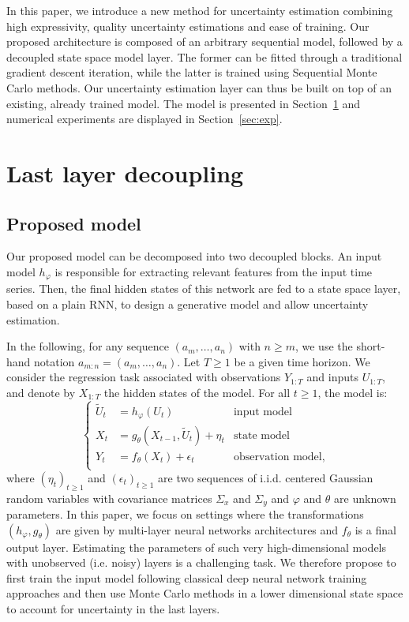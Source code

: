 \documentclass{article}
\begin{document}
In this paper, we introduce a new method for uncertainty estimation combining high expressivity, quality uncertainty estimations and ease of training.
Our proposed architecture is composed of an arbitrary sequential model, followed by a decoupled state space model layer.
The former can be fitted through a traditional gradient descent iteration, while the latter is trained using Sequential Monte Carlo methods.
Our uncertainty estimation layer can thus be built on top of an existing, already trained model. The model is presented in Section~\ref{sec:decoupling} and numerical experiments are displayed in Section~\ref{sec:exp}.

\section{Last layer decoupling}
\label{sec:decoupling}

\subsection{Proposed model}%
\label{sub:proposed_architecture}

Our proposed model can be decomposed into two decoupled blocks.
An input model $h_\varphi$ is responsible for extracting relevant features from the input time series. Then, the final hidden states of this network are fed to a state space layer, based on a plain RNN, to design a generative model and allow uncertainty estimation.

In the following, for any sequence $(a_m,\ldots, a_n)$ with $n\geq m$, we use the short-hand notation $a_{m:n} = (a_m,\ldots, a_n)$. Let $T\ge 1$ be a given time horizon. We consider the regression task associated with observations $Y_{1:T}$ and inputs $U_{1:T}$, and denote by $X_{1:T}$ the hidden states of the model. For all $t\geq 1$, the model is:
\begin{equation*}
	\left\{
	\begin{aligned}
		\widetilde U_t & = h_\varphi(U_t)                             & \text{input model}        \\
		X_t            & = g_\theta(X_{t-1}, \widetilde U_t) + \eta_t & \text{state model}        \\
		Y_t            & = f_\theta(X_t)       + \epsilon_t           & \text{observation model,} \\
	\end{aligned}
	\right.
\end{equation*}
where $(\eta_t)_{t\geq 1}$ and $(\epsilon_t)_{t\geq 1}$ are two sequences of i.i.d. centered Gaussian random variables with covariance matrices $\Sigma_x$ and $\Sigma_y$ and $\varphi$ and $\theta$ are unknown parameters. In this paper, we focus on settings where the transformations $(h_\varphi,g_\theta)$ are given by multi-layer neural networks architectures and $f_\theta$ is a final output layer. Estimating the parameters of such very high-dimensional models with unobserved (i.e. noisy) layers is a challenging task. We therefore propose to first train the input model following classical deep neural network training approaches and then use Monte Carlo methods in a lower dimensional state space to account for uncertainty in the last layers.
\end{document}
